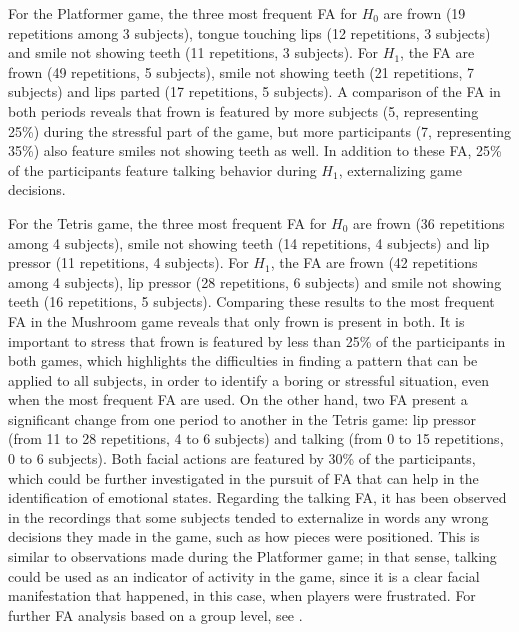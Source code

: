 For the Platformer game, the three most frequent FA for $H_0$ are frown (19 repetitions among 3 subjects), tongue touching lips (12 repetitions, 3 subjects) and smile not showing teeth (11 repetitions, 3 subjects). For $H_1$, the FA are frown (49 repetitions, 5 subjects), smile not showing teeth (21 repetitions, 7 subjects) and lips parted (17 repetitions, 5 subjects). A comparison of the FA in both periods reveals that frown is featured by more subjects (5, representing 25\%) during the stressful part of the game, but more participants (7, representing 35\%) also feature smiles not showing teeth as well. In addition to these FA, 25\% of the participants feature talking behavior during $H_1$, externalizing game decisions.

For the Tetris game, the three most frequent FA for $H_0$ are frown (36 repetitions among 4 subjects), smile not showing teeth (14 repetitions, 4 subjects) and lip pressor (11 repetitions, 4 subjects). For $H_1$, the FA are frown (42 repetitions among 4 subjects), lip pressor (28 repetitions, 6 subjects) and smile not showing teeth (16 repetitions, 5 subjects). Comparing these results to the most frequent FA in the Mushroom game reveals that only frown is present in both. It is important to stress that frown is featured by less than 25\% of the participants in both games, which highlights the difficulties in finding a pattern that can be applied to all subjects, in order to identify a boring or stressful situation, even when the most frequent FA are used. On the other hand, two FA present a significant change from one period to another in the Tetris game: lip pressor (from 11 to 28 repetitions, 4 to 6 subjects) and talking (from 0 to 15 repetitions, 0 to 6 subjects). Both facial actions are featured by 30\% of the participants, which could be further investigated in the pursuit of FA that can help in the identification of emotional states. Regarding the talking FA, it has been observed in the recordings that some subjects tended to externalize in words any wrong decisions they made in the game, such as how pieces were positioned. This is similar to observations made during the Platformer game; in that sense, talking could be used as an indicator of activity in the game, since it is a clear facial manifestation that happened, in this case, when players were frustrated. For further FA analysis based on a group level, see \textcite{bevilacqua2016variations}.

